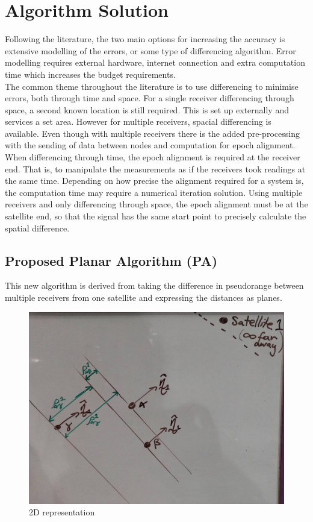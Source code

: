 
\def\chapdir{./ChapterPerception}

\chapter{Algorithm Solution}\label{ch:perception}

Following the literature, the two main options for increasing the accuracy is extensive modelling of the errors, or some type of differencing algorithm. Error modelling requires external hardware, internet connection and extra computation time which increases the budget requirements.\\

The common theme throughout the literature is to use differencing to minimise errors, both through time and space. For a single receiver differencing through space, a second known location is still required. This is set up externally and services a set area. However for multiple receivers, spacial differencing is available. Even though with multiple receivers there is the added pre-processing with the sending of data between nodes and computation for epoch alignment. When differencing through time, the epoch alignment is required at the receiver end. That is, to manipulate the measurements as if the receivers took readings at the same time. Depending on how precise the alignment required for a system is, the computation time may require a numerical iteration solution. Using multiple receivers and only differencing through space, the epoch alignment must be at the satellite end, so that the signal has the same start point to precisely calculate the spatial difference.



\section{Proposed Planar Algorithm (PA)}
This new algorithm is derived from taking the difference in pseudorange between multiple receivers from one satellite and expressing the distances as planes.

\begin{figure}[h]
\centering
\caption{2D representation}
\label{fig:overall_singleS_multiR}
\includegraphics[width=0.7\linewidth]{ChapterLiteratureReview/overall_singleS_multiR.jpg}
\end{figure}

